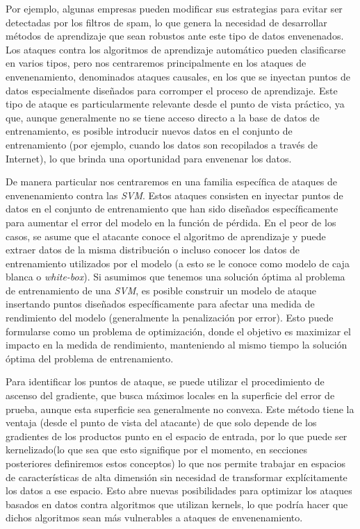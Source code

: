 \documentclass[letterpaper,12pt,oneside]{book}
\begin{document}
{{Por ejemplo, algunas empresas pueden modificar sus estrategias para evitar ser detectadas por los filtros de spam, lo que genera la necesidad de desarrollar métodos de aprendizaje que sean robustos ante este tipo de datos envenenados.  
Los ataques contra los algoritmos de aprendizaje automático pueden clasificarse en varios tipos, pero nos centraremos principalmente en los ataques de envenenamiento, denominados ataques causales, en los que se inyectan puntos de datos especialmente diseñados para corromper el proceso de aprendizaje. Este tipo de ataque es particularmente relevante desde el punto de vista práctico, ya que, aunque generalmente no se tiene acceso directo a la base de datos de entrenamiento, es posible introducir nuevos datos en el conjunto de entrenamiento (por ejemplo, cuando los datos son recopilados a través de Internet), lo que brinda una oportunidad para envenenar los datos.  

De manera particular nos centraremos en una familia específica de ataques de envenenamiento contra las \textit{SVM}. Estos ataques consisten en inyectar puntos de datos en el conjunto de entrenamiento que han sido diseñados específicamente para aumentar el error del modelo en la función de pérdida.  
En el peor de los casos, se asume que el atacante conoce el algoritmo de aprendizaje y puede extraer datos de la misma distribución o incluso conocer los datos de entrenamiento utilizados por el modelo (a esto se le conoce como modelo de caja blanca o \textit{white-box}).  
Si asumimos que tenemos una solución óptima al problema de entrenamiento de una \textit{SVM}, es posible construir un modelo de ataque insertando puntos diseñados específicamente para afectar una medida de rendimiento del modelo (generalmente la penalización por error). Esto puede formularse como un problema de optimización, donde el objetivo es maximizar el impacto en la medida de rendimiento, manteniendo al mismo tiempo la solución óptima del problema de entrenamiento.  

Para identificar los puntos de ataque, se puede utilizar el procedimiento de ascenso del gradiente, que busca máximos locales en la superficie del error de prueba, aunque esta superficie sea generalmente no convexa.  
Este método tiene la ventaja (desde el punto de vista del atacante) de que solo depende de los gradientes de los productos punto en el espacio de entrada, por lo que puede ser kernelizado(lo que sea que esto signifique por el momento, en secciones posteriores definiremos estos conceptos) lo que nos permite trabajar en espacios de características de alta dimensión sin necesidad de transformar explícitamente los datos a ese espacio. Esto abre nuevas posibilidades para optimizar los ataques basados en datos contra algoritmos que utilizan kernels, lo que podría hacer que dichos algoritmos sean más vulnerables a ataques de envenenamiento.  

}}
\end{document}
